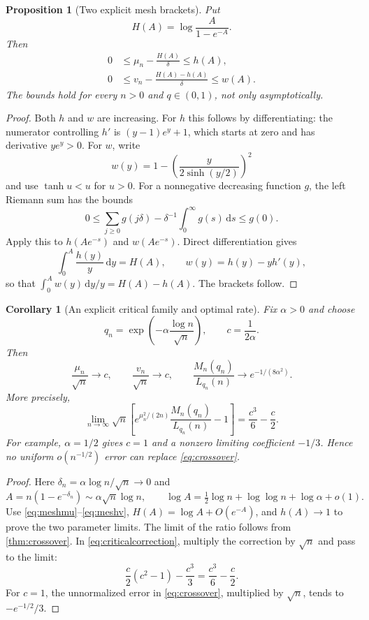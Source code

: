 \documentclass[11pt,a4paper]{article}
\numberwithin{equation}{section}
\newtheorem{proposition}[theorem]{Proposition}
\newtheorem{corollary}[theorem]{Corollary}
\theoremstyle{definition}\newtheorem{definition}[theorem]{Definition}
\theoremstyle{remark}\newtheorem{remark}[theorem]{Remark}
\newcommand{\dd}{\,\mathrm d}
\begin{document}
\begin{proposition}[Two explicit mesh brackets]\label{prop:mesh}
Put
\[
 H(A)=\log\frac{A}{1-e^{-A}}.
\]
Then
\begin{align}
 0&\le\mu_n-\frac{H(A)}{\delta}\le h(A),\label{eq:meshmu}\\
 0&\le v_n-\frac{H(A)-h(A)}{\delta}\le w(A).
 \label{eq:meshv}
\end{align}
The bounds hold for every $n>0$ and $q\in(0,1)$, not only asymptotically.
\end{proposition}
\begin{proof}
Both $h$ and $w$ are increasing. For $h$ this follows by differentiating: the numerator controlling $h'$ is $(y-1)e^y+1$, which starts at zero and has derivative $ye^y>0$. For $w$, write
\[
 w(y)=1-\left(\frac{y}{2\sinh(y/2)}\right)^2
\]
and use $\tanh u<u$ for $u>0$.
For a nonnegative decreasing function $g$, the left Riemann sum has the bounds
\[
 0\le\sum_{j\ge0}g(j\delta)-\delta^{-1}\int_0^\infty g(s)\dd s\le g(0).
\]
Apply this to $h(Ae^{-s})$ and $w(Ae^{-s})$. Direct differentiation gives
\[
 \int_0^A\frac{h(y)}y\dd y=H(A),\qquad
 w(y)=h(y)-yh'(y),
\]
so that $\int_0^Aw(y)\dd y/y=H(A)-h(A)$. The brackets follow.
\end{proof}

\begin{corollary}[An explicit critical family and optimal rate]\label{cor:criticalgeometric}
Fix $\alpha>0$ and choose
\begin{equation}\label{eq:qcritical}
 q_n=\exp\!\left(-\alpha\frac{\log n}{\sqrt n}\right),\qquad
 c=\frac1{2\alpha}.
\end{equation}
Then
\begin{equation}\label{eq:criticalparameters}
 \frac{\mu_n}{\sqrt n}\to c,\qquad \frac{v_n}{\sqrt n}\to c,
 \qquad \frac{M_n(q_n)}{L_{q_n}(n)}\to e^{-1/(8\alpha^2)}.
\end{equation}
More precisely,
\begin{equation}\label{eq:criticalconstant}
 \lim_{n\to\infty}\sqrt n\left[
 e^{\mu_n^2/(2n)}\frac{M_n(q_n)}{L_{q_n}(n)}-1\right]
       =\frac{c^3}{6}-\frac c2.
\end{equation}
For example, $\alpha=1/2$ gives $c=1$ and a nonzero limiting coefficient $-1/3$. Hence no uniform $o(n^{-1/2})$ error can replace \eqref{eq:crossover}.
\end{corollary}
\begin{proof}
Here $\delta_n=\alpha\log n/\sqrt n\to0$ and
\[
 A=n(1-e^{-\delta_n})\sim\alpha\sqrt n\log n,
 \qquad \log A=\tfrac12\log n+\log\log n+\log\alpha+o(1).
\]
Use \eqref{eq:meshmu}--\eqref{eq:meshv}, $H(A)=\log A+O(e^{-A})$, and $h(A)\to1$ to prove the two parameter limits. The limit of the ratio follows from \cref{thm:crossover}.
In \eqref{eq:criticalcorrection}, multiply the correction by $\sqrt n$ and pass to the limit:
\[
 \frac c2(c^2-1)-\frac{c^3}{3}=\frac{c^3}{6}-\frac c2.
\]
For $c=1$, the unnormalized error in \eqref{eq:crossover}, multiplied by $\sqrt n$, tends to $-e^{-1/2}/3$.
\end{proof}
\end{document}
